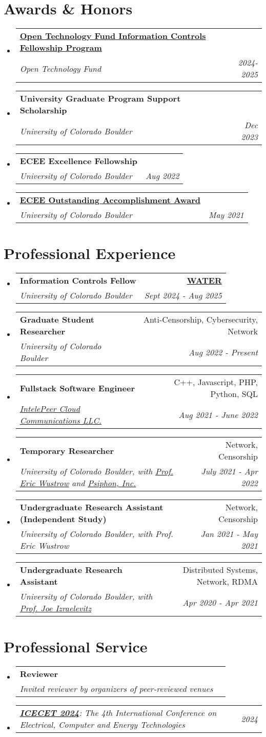 \documentclass[letterpaper,11pt]{article}
\makeatletter
\newcommand{\resumeSubheading}[4]{
  \vspace{-2pt}\item
    \begin{tabular*}{0.97\textwidth}[t]{l@{\extracolsep{\fill}}r}
      \textbf{#1} & #2 \\
      \textit{\small#3} & \textit{\small #4} \\
    \end{tabular*}\vspace{-7pt}
}
\newcommand{\resumeSubSubheading}[2]{
    \item
    \begin{tabular*}{0.97\textwidth}{l@{\extracolsep{\fill}}r}
      \textit{\small#1} & \textit{\small #2} \\
    \end{tabular*}\vspace{-7pt}
}
\newcommand{\resumeSubHeadingListStart}{\begin{itemize}[leftmargin=0.15in, label={}]}
\newcommand{\resumeSubHeadingListEnd}{\end{itemize}}
\makeatother
\begin{document}
\section{Awards \& Honors}
\resumeSubHeadingListStart
\resumeSubheading
{\href{https://www.opentech.fund/fellowships/icfp/}{Open Technology Fund Information Controls Fellowship Program}}{}
{Open Technology Fund}{2024-2025}
\resumeSubheading
{University Graduate Program Support Scholarship}{}
{University of Colorado Boulder}{Dec 2023}
\resumeSubheading
{ECEE Excellence Fellowship}{}
{University of Colorado Boulder}{Aug 2022}
\resumeSubheading
{\href{https://www.colorado.edu/ecee/celebrating-class-2021}{ECEE Outstanding Accomplishment Award}}{}
{University of Colorado Boulder}{May 2021}
\resumeSubHeadingListEnd
\vspace{1pt}

\section{Professional Experience}
\resumeSubHeadingListStart
\resumeSubheading
{Information Controls Fellow}{\hyperref[sec:water]{\textbf{WATER}}}
{University of Colorado Boulder}{Sept 2024 - Aug 2025}
\resumeSubheading
{Graduate Student Researcher}{Anti-Censorship, Cybersecurity, Network}
{University of Colorado Boulder}{Aug 2022 - Present}
\resumeSubheading
{Fullstack Software Engineer}{C++, Javascript, PHP, Python, SQL}
{\href{https://intelepeer.ai/}{IntelePeer Cloud Communications LLC.}}{Aug 2021 - June 2022}
\resumeSubheading
{Temporary Researcher}{Network, Censorship}
{University of Colorado Boulder, with 
  \href{https://www.colorado.edu/ecee/eric-wustrow}{Prof. Eric Wustrow} 
and 
  \href{https://psiphon.ca/}{Psiphon, Inc.}
}{July 2021 - Apr 2022}
\resumeSubheading
{Undergraduate Research Assistant (Independent Study)}{Network, Censorship}
{University of Colorado Boulder, with Prof. Eric Wustrow}{Jan 2021 - May 2021}
\resumeSubheading
{Undergraduate Research Assistant}{Distributed Systems, Network, RDMA}
{University of Colorado Boulder, with 
  \href{https://www.colorado.edu/ecee/joseph-joe-izraelevitz}{Prof. Joe Izraelevitz}
}{Apr 2020 - Apr 2021}
\resumeSubHeadingListEnd
\vspace{1pt}

\section{Professional Service}
\resumeSubHeadingListStart
\resumeSubheading
{Reviewer}{}
{Invited reviewer by organizers of peer-reviewed venues}{}
\resumeSubSubheading
{
  \em\href{https://www.icecet.com/}{\textbf{ICECET 2024}}: The 4th International Conference on Electrical, Computer and Energy Technologies
}{2024}
\resumeSubHeadingListEnd
\end{document}
